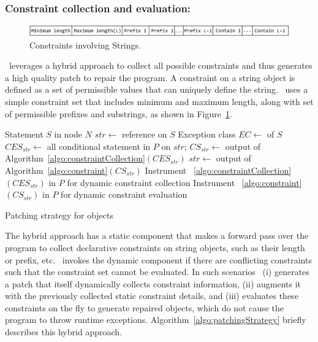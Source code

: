 \subsubsection{Constraint collection and evaluation: }
\label{sec:tool:stage2:generation}

\begin{figure}[t]
\centering
\includegraphics[width=\linewidth]{images/constraint.eps}
\caption{Constraints involving Strings.}
\label{fig:constraint}
\end{figure}

\tool\ leverages a hybrid approach to collect all possible constraints and thus
generates a high quality patch to repair the program. A constraint on a string
object is defined as a set of permissible values that can uniquely define the
string. \tool\ uses a simple constraint set that includes minimum and maximum
length, along with set of permissible prefixes and substrings, as shown in
Figure~\ref{fig:constraint}.

\begin{algorithm}[t]
\scriptsize
\DontPrintSemicolon
{}
\Begin
{
 {
  Statement $S$ in node $N$\;
  {
  	$str \longleftarrow$  reference on $S$\;
  	{
  		Exception class $EC \longleftarrow$  of
$S$\;
  		$CES_{str} \longleftarrow$ all conditional statement in $P$ on
$str$;
  		$CS_{str} \longleftarrow$ output of
  		Algorithm~\ref{algo:constraintCollection}$(CES_{str})$ \;
  		{
  			$str \longleftarrow$ output of
Algorithm~\ref{algo:constraint}$(CS_{str})$\;
  		} 
  		Instrument ~\ref{algo:constraintCollection}$(CES_{str})$ in $P$
for dynamic
  		constraint collection\;
  		Instrument ~\ref{algo:constraint}$(CS_{str})$ in $P$ for dynamic
  		constraint evaluation\;
  	}
  }
 }
}
\caption{Patching strategy for  objects}
 \label{algo:patchingStrategy}
\end{algorithm}

The hybrid approach has a static component that makes a forward pass over the
program to collect declarative constraints on string objects, such as their
length or prefix, etc. \tool\ invokes the dynamic component if there are
conflicting constraints such that the constraint set cannot be evaluated. In
such scenarios \tool\ (i) generates a patch that itself dynamically collects
constraint information, (ii) augments it with the previously collected static
constraint details, and (iii) evaluates these constraints on the fly to generate
repaired  objects, which do not cause the program to throw runtime
exceptions. Algorithm~\ref{algo:patchingStrategy} briefly describes this hybrid
approach.

